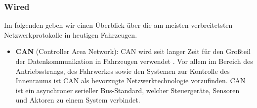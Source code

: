         \subsubsection{Wired}
        Im folgenden geben wir einen Überblick über die am meisten verbreitetsten Netzwerkprotokolle in heutigen Fahrzeugen. 
            \begin{itemize}
                \item \textbf{CAN} (Controller Area Network): CAN wird seit langer Zeit für den Großteil der Datenkommunikation in Fahrzeugen verwendet \cite{leen1999digital}.
                Vor allem im Bereich des Antriebsstrangs, des Fahrwerkes sowie den Systemen zur Kontrolle des Innenraums ist CAN als bevorzugte Netzwerktechnologie vorzufinden.
                CAN ist ein asynchroner serieller Bus-Standard, welcher Steuergeräte, Sensoren und Aktoren zu einem System verbindet. 
                

\end{itemize}
